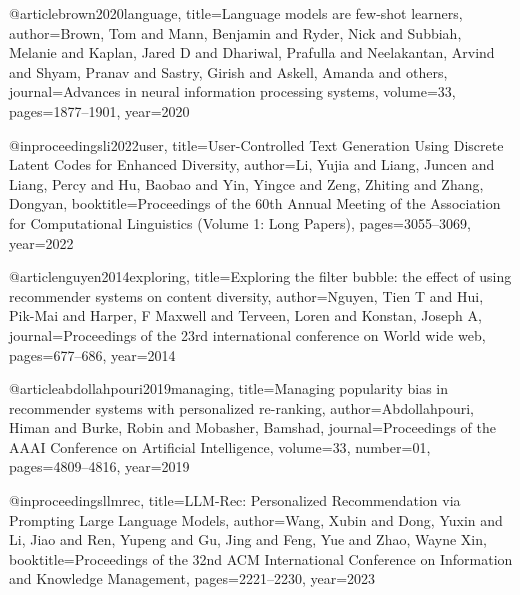 \documentclass[10pt,twocolumn,letterpaper]{article}
\begin{document}
\begin{thebibliography}{99}

@article{brown2020language,
  title={Language models are few-shot learners},
  author={Brown, Tom and Mann, Benjamin and Ryder, Nick and Subbiah, Melanie and Kaplan, Jared D and Dhariwal, Prafulla and Neelakantan, Arvind and Shyam, Pranav and Sastry, Girish and Askell, Amanda and others},
  journal={Advances in neural information processing systems},
  volume={33},
  pages={1877--1901},
  year={2020}
}

@inproceedings{li2022user,
  title={User-Controlled Text Generation Using Discrete Latent Codes for Enhanced Diversity},
  author={Li, Yujia and Liang, Juncen and Liang, Percy and Hu, Baobao and Yin, Yingce and Zeng, Zhiting and Zhang, Dongyan},
  booktitle={Proceedings of the 60th Annual Meeting of the Association for Computational Linguistics (Volume 1: Long Papers)},
  pages={3055--3069},
  year={2022}
}

@article{nguyen2014exploring,
  title={Exploring the filter bubble: the effect of using recommender systems on content diversity},
  author={Nguyen, Tien T and Hui, Pik-Mai and Harper, F Maxwell and Terveen, Loren and Konstan, Joseph A},
  journal={Proceedings of the 23rd international conference on World wide web},
  pages={677--686},
  year={2014}
}

@article{abdollahpouri2019managing,
  title={Managing popularity bias in recommender systems with personalized re-ranking},
  author={Abdollahpouri, Himan and Burke, Robin and Mobasher, Bamshad},
  journal={Proceedings of the AAAI Conference on Artificial Intelligence},
  volume={33},
  number={01},
  pages={4809--4816},
  year={2019}
}

@inproceedings{llmrec,
  title={LLM-Rec: Personalized Recommendation via Prompting Large Language Models},
  author={Wang, Xubin and Dong, Yuxin and Li, Jiao and Ren, Yupeng and Gu, Jing and Feng, Yue and Zhao, Wayne Xin},
  booktitle={Proceedings of the 32nd ACM International Conference on Information and Knowledge Management},
  pages={2221--2230},
  year={2023}
}

\end{thebibliography}
\end{document}
